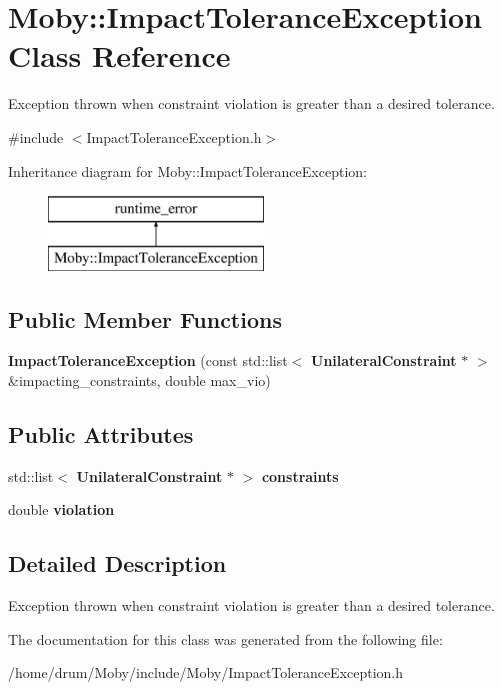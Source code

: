 \section{Moby\-:\-:Impact\-Tolerance\-Exception Class Reference}
\label{classMoby_1_1ImpactToleranceException}


Exception thrown when constraint violation is greater than a desired tolerance.  




{\ttfamily \#include $<$Impact\-Tolerance\-Exception.\-h$>$}

Inheritance diagram for Moby\-:\-:Impact\-Tolerance\-Exception\-:\begin{figure}[H]
\begin{center}
\leavevmode
\includegraphics[height=2.000000cm]{classMoby_1_1ImpactToleranceException}
\end{center}
\end{figure}
\subsection*{Public Member Functions}
\begin{DoxyCompactItemize}
\item 
{\bfseries Impact\-Tolerance\-Exception} (const std\-::list$<$ {\bf Unilateral\-Constraint} $\ast$ $>$ \&impacting\-\_\-constraints, double max\-\_\-vio)\label{classMoby_1_1ImpactToleranceException_a2ee5b0db75e99e7c98a6c108df8df469}

\end{DoxyCompactItemize}
\subsection*{Public Attributes}
\begin{DoxyCompactItemize}
\item 
std\-::list$<$ {\bf Unilateral\-Constraint} $\ast$ $>$ {\bfseries constraints}\label{classMoby_1_1ImpactToleranceException_afa84ee489c09193673a1c1dabefe529e}

\item 
double {\bfseries violation}\label{classMoby_1_1ImpactToleranceException_a0364fea9c586d2feddbdbc06c08ddf70}

\end{DoxyCompactItemize}


\subsection{Detailed Description}
Exception thrown when constraint violation is greater than a desired tolerance. 

The documentation for this class was generated from the following file\-:\begin{DoxyCompactItemize}
\item 
/home/drum/\-Moby/include/\-Moby/Impact\-Tolerance\-Exception.\-h\end{DoxyCompactItemize}
